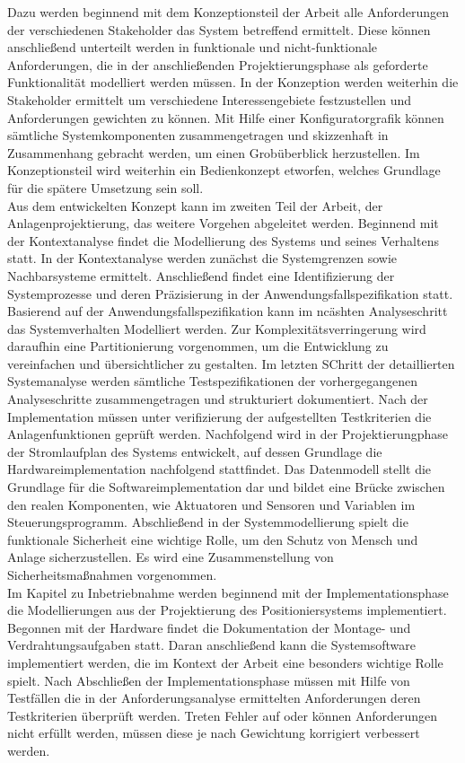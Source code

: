 \documentclass[../../Bachelorarbeit.tex]{subfiles}
\begin{document}
Dazu werden beginnend mit dem Konzeptionsteil der Arbeit alle Anforderungen der verschiedenen Stakeholder das System betreffend ermittelt. Diese können anschließend unterteilt werden in funktionale und nicht-funktionale Anforderungen, die in der anschließenden Projektierungsphase als geforderte Funktionalität modelliert werden müssen. In der Konzeption werden weiterhin die Stakeholder ermittelt um verschiedene Interessengebiete festzustellen und Anforderungen gewichten zu können. Mit Hilfe einer Konfiguratorgrafik können sämtliche Systemkomponenten zusammengetragen und skizzenhaft in Zusammenhang gebracht werden, um einen Grobüberblick herzustellen. Im Konzeptionsteil wird weiterhin ein Bedienkonzept etworfen, welches Grundlage für die spätere Umsetzung sein soll.\\
Aus dem entwickelten Konzept kann im zweiten Teil der Arbeit, der Anlagenprojektierung, das weitere Vorgehen abgeleitet werden. Beginnend mit der Kontextanalyse findet die Modellierung des Systems und seines Verhaltens statt. In der Kontextanalyse werden zunächst die Systemgrenzen sowie Nachbarsysteme ermittelt. Anschließend findet eine Identifizierung der Systemprozesse und deren Präzisierung in der Anwendungsfallspezifikation statt. Basierend auf der Anwendungsfallspezifikation kann im ncäshten Analyseschritt das Systemverhalten Modelliert werden. Zur Komplexitätsverringerung wird daraufhin eine Partitionierung vorgenommen, um die Entwicklung zu vereinfachen und übersichtlicher zu gestalten. Im letzten SChritt der detaillierten Systemanalyse werden sämtliche Testspezifikationen der vorhergegangenen Analyseschritte zusammengetragen und strukturiert dokumentiert. Nach der Implementation müssen unter verifizierung der aufgestellten Testkriterien die Anlagenfunktionen geprüft werden. Nachfolgend wird in der Projektierungphase der Stromlaufplan des Systems entwickelt, auf dessen Grundlage die Hardwareimplementation nachfolgend stattfindet. Das Datenmodell stellt die Grundlage für die Softwareimplementation dar und bildet eine Brücke zwischen den realen Komponenten, wie Aktuatoren und Sensoren und Variablen im Steuerungsprogramm. Abschließend in der Systemmodellierung spielt die funktionale Sicherheit eine wichtige Rolle, um den Schutz von Mensch und Anlage sicherzustellen. Es wird eine Zusammenstellung von Sicherheitsmaßnahmen vorgenommen.\\
Im Kapitel zu Inbetriebnahme werden beginnend mit der Implementationsphase die Modellierungen aus der Projektierung des Positioniersystems implementiert. Begonnen mit der Hardware findet die Dokumentation der Montage- und Verdrahtungsaufgaben statt. Daran anschließend kann die Systemsoftware implementiert werden, die im Kontext der Arbeit eine besonders wichtige Rolle spielt. Nach Abschließen der Implementationsphase müssen mit Hilfe von Testfällen die in der Anforderungsanalyse ermittelten Anforderungen \bzw deren Testkriterien überprüft werden. Treten Fehler auf oder können Anforderungen nicht erfüllt werden, müssen diese je nach Gewichtung korrigiert \bzw verbessert werden.\\
\end{document}
